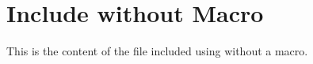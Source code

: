 \section{Include without Macro}
This is the content of the file included using \verb|| without a macro.